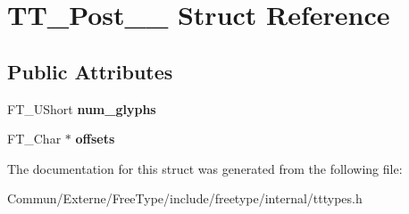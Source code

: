 \hypertarget{struct_t_t___post__25__}{}\section{T\+T\+\_\+\+Post\+\_\+\_\+ Struct Reference}
\label{struct_t_t___post__25__}
\subsection*{Public Attributes}
\begin{DoxyCompactItemize}
\item 
F\+T\+\_\+\+U\+Short {\bfseries num\+\_\+glyphs}\hypertarget{struct_t_t___post__25___aae397ce6206c910ecc13f8b46bace595}{}\label{struct_t_t___post__25___aae397ce6206c910ecc13f8b46bace595}

\item 
F\+T\+\_\+\+Char $\ast$ {\bfseries offsets}\hypertarget{struct_t_t___post__25___a499ec966b258c8454e9ea8f9455028b6}{}\label{struct_t_t___post__25___a499ec966b258c8454e9ea8f9455028b6}

\end{DoxyCompactItemize}


The documentation for this struct was generated from the following file\+:\begin{DoxyCompactItemize}
\item 
Commun/\+Externe/\+Free\+Type/include/freetype/internal/tttypes.\+h\end{DoxyCompactItemize}
